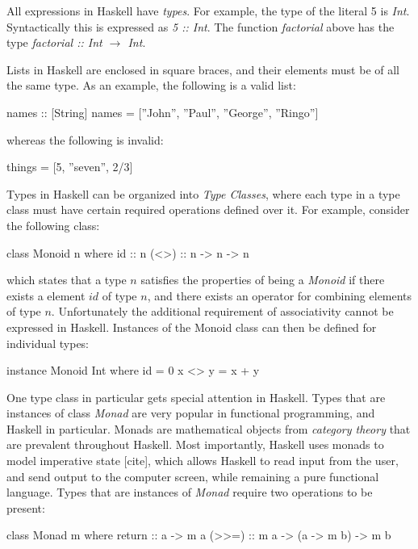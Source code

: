 \documentclass[thesis.tex]{subfiles}
\begin{document}
All expressions in Haskell have \emph{types}. For example, the type of the literal
5 is \emph{Int}. Syntactically this is expressed as \emph{5 :: Int}. The function
\emph{factorial} above has the type \emph{factorial :: Int $\rightarrow$ Int}.

Lists in Haskell are enclosed in square braces, and their elements must be of all
the same type. As an example, the following is a valid list:

\begin{spec}
names :: [String]
names = [''John'', ''Paul'', ''George'', ''Ringo'']
\end{spec}

whereas the following is invalid:

\begin{spec}
things = [5, ''seven'', 2/3]
\end{spec}

Types in Haskell can be organized into \emph{Type Classes}, where each type in a
type class must have certain required operations defined over it. For example, consider
the following class:

\begin{spec}
class Monoid n where
    id  :: n
    (<>) :: n -> n -> n
\end{spec}

which states that a type $n$ satisfies the properties of being a \emph{Monoid} if there exists
a element $id$ of type $n$, and there exists an operator for combining elements of type $n$.
Unfortunately the additional requirement of associativity cannot be expressed in Haskell.
Instances of the Monoid class can then be defined for individual types:

\begin{spec}
instance Monoid Int where
    id = 0
    x <> y = x + y
\end{spec}

One type class in particular gets special attention in Haskell. Types that are instances of
class \emph{Monad} are very popular in functional programming, and Haskell in particular. Monads
are mathematical objects from \emph{category theory} that are prevalent throughout Haskell. Most
importantly, Haskell uses monads to model imperative state [cite], which allows Haskell to read
input from the user, and send output to the computer screen, while remaining a pure functional
language. Types that are instances of \emph{Monad} require two operations to be present:

\begin{spec}
class Monad m where
    return :: a -> m a
    (>>=)  :: m a -> (a -> m b) -> m b
\end{spec}
\end{document}
